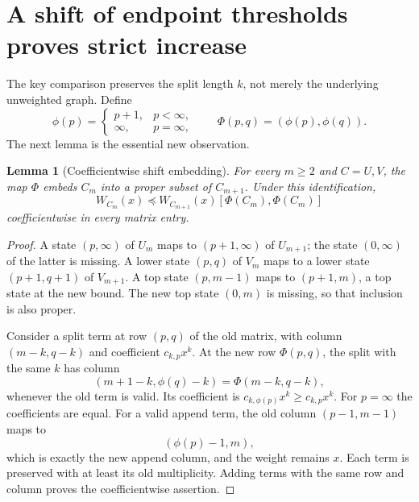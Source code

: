\documentclass[11pt,a4paper]{article}
\newtheorem{lemma}[lemma]{Lemma}
\theoremstyle{definition}\newaliascnt{definition}{theorem}
\theoremstyle{remark}\newaliascnt{remark}{theorem}
\newcommand{\preceqc}{\preceq}
\newcommand{\shift}{\Phi}
\begin{document}
\section{A shift of endpoint thresholds proves strict increase}
\label{sec:strict}
The key comparison preserves the split length $k$, not merely the
underlying unweighted graph. Define
\[
 \phi(p)=\begin{cases}p+1,&p<\infty,\\ \infty,&p=\infty,\end{cases}
 \qquad \shift(p,q)=(\phi(p),\phi(q)).
\]
The next lemma is the essential new observation.

\begin{lemma}[Coefficientwise shift embedding]\label{lem:shift}
For every $m\ge2$ and $C=U,V$, the map $\shift$ embeds $C_m$ into a proper
subset of $C_{m+1}$. Under this identification,
\begin{equation}
 W_{C_m}(x)\preceqc
 W_{C_{m+1}}(x)[\shift(C_m),\shift(C_m)]
 \label{eq:embedding}
\end{equation}
coefficientwise in every matrix entry.
\end{lemma}
\begin{proof}
A state $(p,\infty)$ of $U_m$ maps to $(p+1,\infty)$ of $U_{m+1}$; the
state $(0,\infty)$ of the latter is missing. A lower state $(p,q)$ of $V_m$
maps to a lower state $(p+1,q+1)$ of $V_{m+1}$. A top state $(p,m-1)$ maps
to $(p+1,m)$, a top state at the new bound. The new top state $(0,m)$ is
missing, so that inclusion is also proper.

Consider a split term at row $(p,q)$ of the old matrix, with column
$(m-k,q-k)$ and coefficient $c_{k,p}x^k$. At the new row $\shift(p,q)$,
the split with the same $k$ has column
\[
 (m+1-k,\phi(q)-k)=\shift(m-k,q-k),
\]
whenever the old term is valid. Its coefficient is
$c_{k,\phi(p)}x^k\ge c_{k,p}x^k$. For $p=\infty$ the coefficients are equal.
For a valid append term, the old column $(p-1,m-1)$ maps to
\[
 (\phi(p)-1,m),
\]
which is exactly the new append column, and the weight remains $x$.
Each term is preserved with at least its old multiplicity. Adding terms
with the same row and column proves the coefficientwise assertion.
\end{proof}
\end{document}

